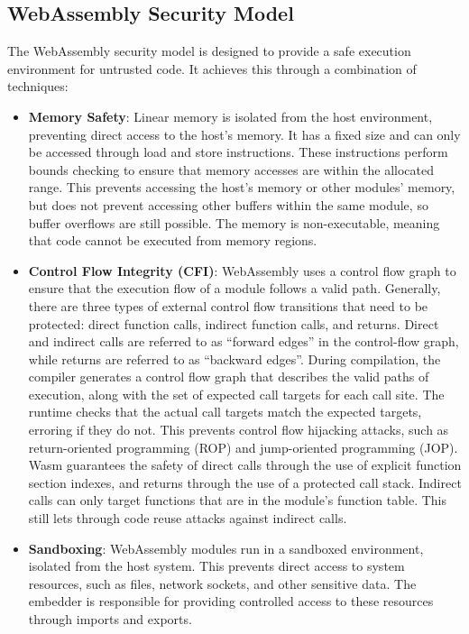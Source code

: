 \documentclass{article}
\begin{document}
\subsection{WebAssembly Security Model}
The WebAssembly security model is designed to provide a safe execution environment for untrusted code. It achieves this through a combination of techniques:

\begin{itemize}
    \item \textbf{Memory Safety}: Linear memory is isolated from the host environment, preventing direct access to the host's memory. It has a fixed size and can only be accessed through load and store instructions. These instructions perform bounds checking to ensure that memory accesses are within the allocated range. This prevents accessing the host's memory or other modules' memory, but does not prevent accessing other buffers within the same module, so buffer overflows are still possible. The memory is non-executable, meaning that code cannot be executed from memory regions.
    \item \textbf{Control Flow Integrity (CFI)}: WebAssembly uses a control flow graph to ensure that the execution flow of a module follows a valid path. Generally, there are three types of external control flow transitions that need to be protected: direct function calls, indirect function calls, and returns. Direct and indirect calls are referred to as ``forward edges'' in the control-flow graph, while returns are referred to as ``backward edges''. During compilation, the compiler generates a control flow graph that describes the valid paths of execution, along with the set of expected call targets for each call site. The runtime checks that the actual call targets match the expected targets, erroring if they do not. This prevents control flow hijacking attacks, such as return-oriented programming (ROP) and jump-oriented programming (JOP). Wasm guarantees the safety of direct calls through the use of explicit function section indexes, and returns through the use of a protected call stack. Indirect calls can only target functions that are in the module's function table. This still lets through code reuse attacks against indirect calls.
    \item \textbf{Sandboxing}: WebAssembly modules run in a sandboxed environment, isolated from the host system. This prevents direct access to system resources, such as files, network sockets, and other sensitive data. The embedder is responsible for providing controlled access to these resources through imports and exports.

\end{itemize}
\end{document}
